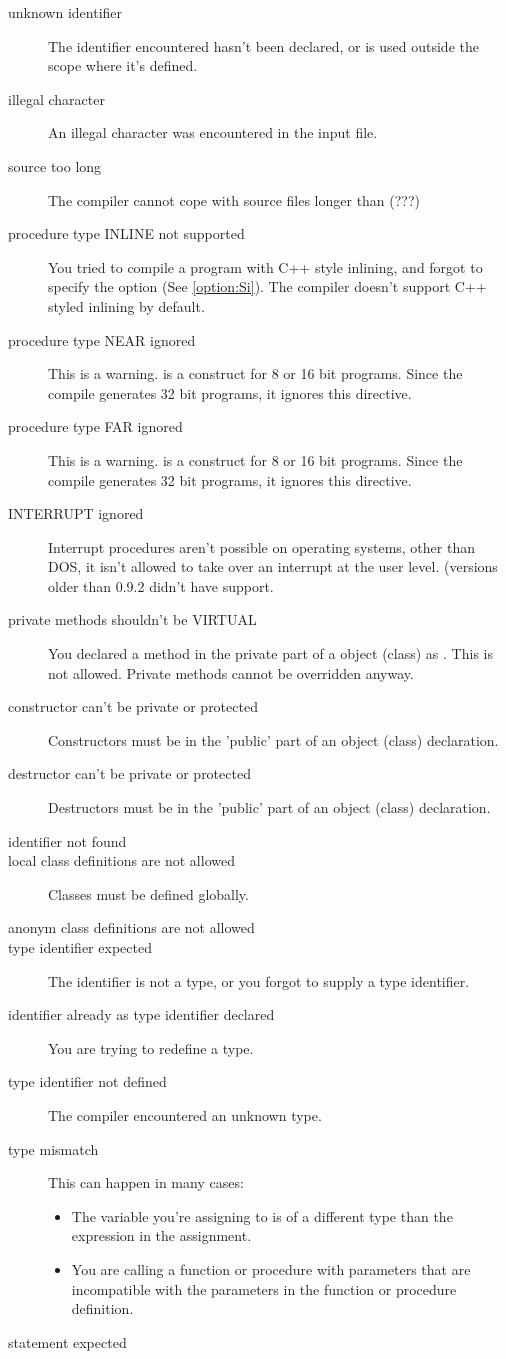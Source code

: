 \documentclass{report}
\newcommand{\seeo}[1]{See \ref{option:#1}}
\begin{document}
\begin{description}
\item [unknown identifier]
The identifier encountered hasn't been declared, or is used outside the
scope where it's defined.
\item [illegal character]
An illegal character was encountered in the input file. 
\item [source too long]
The compiler cannot cope with source files longer than (???)
\item [procedure type INLINE not supported]
You tried to compile a program with C++ style inlining, and forgot to
specify the  option (\seeo{Si}). The compiler doesn't support C++
styled inlining by default. 
\item [procedure type NEAR ignored]
This is a warning.  is a construct for 8 or 16 bit programs. Since
the compile generates 32 bit programs, it ignores this directive.
\item [procedure type FAR ignored]
This is a warning.  is a construct for 8 or 16 bit programs. Since
the compile generates 32 bit programs, it ignores this directive.
\item [INTERRUPT ignored]
Interrupt procedures aren't possible on operating systems, other than DOS, 
it isn't allowed to take over an interrupt at the user level. (versions
older than 0.9.2 didn't have  support.
\item [private methods shouldn't be VIRTUAL]
You declared a method in the private part of a object (class) as
. This is not allowed. Private methods cannot be overridden
anyway.
\item [constructor can't be private or protected]
Constructors must be in the 'public' part of an object (class) declaration. 
\item [destructor can't be private or protected]
Destructors must be in the 'public' part of an object (class) declaration. 
\item [identifier not found]
\item [local class definitions are not allowed]
Classes must be defined globally.
\item [anonym class definitions are not allowed]
\item [type identifier expected]
The identifier is not a type, or you forgot to supply a type identifier.
\item [identifier already as type identifier declared]
You are trying to redefine a type.
\item [type identifier not defined]
The compiler encountered an unknown type.
\item [type mismatch]
This can happen in many cases:
\begin{itemize}
\item The variable you're assigning to is of a different type than the
expression in the assignment.
\item You are calling a function or procedure with parameters that are 
incompatible with the parameters in the function or procedure definition.
\end{itemize}
\item [statement expected]


\end{description}
\end{document}
